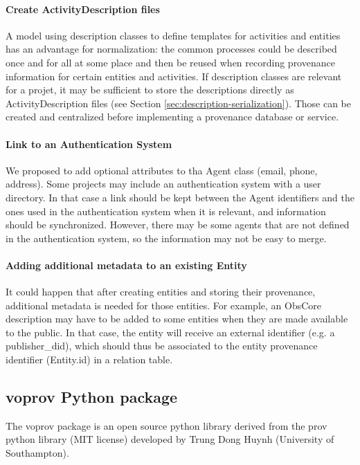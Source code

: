 \paragraph{Create ActivityDescription files}
A model using description classes to define templates for activities and
entities has an advantage for normalization: the common processes could be
described once and for all at some place and then be reused when recording
provenance information for certain entities and activities.
If description classes are relevant for a projet, it may be sufficient to store the descriptions directly as ActivityDescription files (see Section \ref{sec:description-serialization}). 
Those can be created and centralized before implementing a provenance database or service.

\paragraph{Link to an Authentication System}
We proposed to add optional attributes to tha Agent class (email, phone, address). Some projects may include an authentication system with a user directory. In that case a link should be kept between the Agent identifiers and the ones used in the authentication system when it is relevant, and information should be synchronized. However, there may be some agents that are not defined in the authentication system, so the information may not be easy to merge.

\paragraph{Adding additional metadata to an existing Entity}
It could happen that after creating entities and storing their provenance, additional metadata is needed for those entities. For example, an ObsCore description may have to be added to some entities when they are made available to the public. In that case, the entity will receive an external identifier (e.g. a publisher\_did), which should thus be associated to the entity provenance identifier (Entity.id) in a relation table.


\subsection{voprov Python package}\label{sec:implementation_voprov}
The voprov package is an open source python library derived from the prov python
library (MIT license) developed by Trung Dong Huynh (University of
Southampton). 

